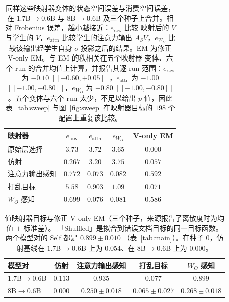 \documentclass[11pt]{article}
\begin{document}
\begin{table}[t]
\centering
\small
\caption{同样这些映射器变体的状态空间误差与消费空间误差，在 $1.7$B$\to0.6$B 与
$8$B$\to0.6$B 及三个种子上合并。相对 Frobenius 误差，越小越接近：$e_{\text{raw}}$ 比较
映射后的 $V$ 与学生的 $V$，$e_{\text{attn}}$ 比较学生的注意力输出 $A_S V$，$e_{W_O}$
比较该输出经学生自身 $o$ 投影之后的结果。EM 为修正 V-only EM。与 EM 的秩相关在五个映射器
变体、六个 run 的合并均值上计算，并报告其逐 run 范围：$e_{\text{raw}}$ 为 $-0.10$
$[[-0.60,+0.05]]$，$e_{\text{attn}}$ 为 $-1.00$ $[[-1.00,-0.80]]$，$e_{W_O}$ 为 $-0.80$
$[[-1.00,-0.80]]$。五个变体与六个 run 太少，不足以给出 $p$ 值，因此表~\ref{tab:sweep}
与图~\ref{fig:sweep} 在映射器目标的 $198$ 个配置上重复该比较。}
\label{tab:errorbudget}
\begin{tabular}{lcccc}
\toprule
映射器 & $e_{\text{raw}}$ & $e_{\text{attn}}$ & $e_{W_O}$ & V-only EM \\
\midrule
原始层选择    & $3.73$ & $3.72$ & $3.65$ & $0.000$ \\
仿射                 & $\mathbf{0.267}$ & $3.20$ & $3.75$ & $0.057$ \\
注意力输出感知 & $0.772$ & $0.073$ & $0.082$ & $\mathbf{0.592}$ \\
打乱目标        & $5.58$ & $0.903$ & $1.09$ & $0.071$ \\
$W_O$ 感知            & $0.699$ & $\mathbf{0.076}$ & $\mathbf{0.081}$ & $0.586$ \\
\bottomrule
\end{tabular}
\end{table}

\begin{table}[t]
\centering
\small
\caption{值映射器目标与修正 V-only EM（三个种子，来源报告了离散度时为均值 $\pm$ 标准差）。
「Shuffled」是拟合到错误文档目标的同一目标函数。两个模型对的 Self 都是 $0.899 \pm 0.010$
（表~\ref{tab:main}）。在种子 0，仿射基线在 $1.7$B$\to0.6$B 上为 $0.054$、在
$8$B$\to0.6$B 上为 $0.000$。}
\label{tab:mappers}
\begin{tabular}{lcccc}
\toprule
模型对 & 仿射 & 注意力输出感知 & 打乱目标 & $W_O$ 感知 \\
\midrule
$1.7$B$\to0.6$B & $0.113$ & $\mathbf{0.935}$ & $0.077$ & $0.899$ \\
$8$B$\to0.6$B   & $0.000$ & $0.250{\pm}0.018$ & $0.065{\pm}0.027$ & $\mathbf{0.268{\pm}0.018}$ \\
\bottomrule
\end{tabular}
\end{table}
\end{document}
